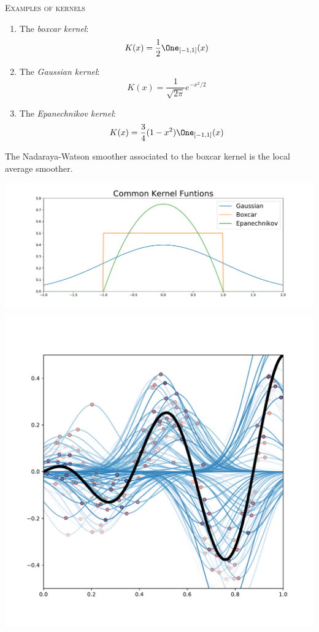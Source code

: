 \documentclass{beamer}
\begin{document}
\begin{frame}{{\large{\textsc{Examples of kernels}}}}
\begin{enumerate}
    \item The \emph{boxcar kernel}:
    \[
        K(x) = \frac12\One_{[-1, 1]}(x)
    \]
    \item The \emph{Gaussian kernel}:
    \[
        K(x) = \frac1{\sqrt{2\pi}}e^{-x^2/2}
    \]
    \item The \emph{Epanechnikov kernel}:
    \[
        K(x) = \frac34(1-x^2)\One_{[-1, 1]}(x)
    \]
\end{enumerate}
The Nadaraya-Watson smoother associated to the boxcar kernel is the local average smoother.
\end{frame}

\begin{frame}{}
    \includegraphics[scale=0.36]{kernels.pdf}
\end{frame}

\begin{frame}{}
    \begin{center}
        \includegraphics[scale=0.42]{waves.pdf}
    \end{center}
\end{frame}
\end{document}
